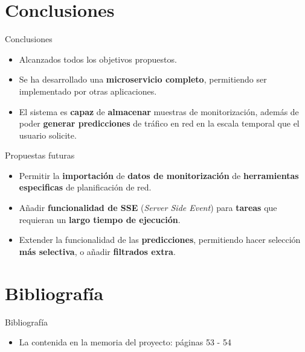 \documentclass[aspectratio=169,xcolor=dvipsnames]{beamer}
\begin{document}
	
	\section{Conclusiones}
	
	\begin{frame}{Conclusiones}
		\begin{itemize}
			\item Alcanzados todos los objetivos propuestos.
			
			\item Se ha desarrollado una \textbf{microservicio completo}, permitiendo ser implementado por otras aplicaciones.
			
			\item El sistema es \textbf{capaz} de \textbf{almacenar} muestras de monitorización, además de poder \textbf{generar predicciones} de tráfico en red en la escala temporal que el usuario solicite.
		\end{itemize}
	
		\begin{exampleblock}{Propuestas futuras}
			\begin{itemize}
				\item Permitir la \textbf{importación} de \textbf{datos de monitorización} de \textbf{herramientas especificas} de planificación de red.
				
				\item Añadir \textbf{funcionalidad de SSE} (\textit{Server Side Event}) para \textbf{tareas} que requieran un \textbf{largo tiempo de ejecución}.
				
				\item Extender la funcionalidad de las \textbf{predicciones}, permitiendo hacer selección \textbf{más selectiva}, o añadir \textbf{filtrados extra}.
			\end{itemize}
		\end{exampleblock}
	\end{frame}
	
	
	\section{Bibliografía}
	
	\begin{frame}{Bibliografía}
		\begin{itemize}
		    \item La contenida en la memoria del proyecto: páginas 53 - 54
		\end{itemize}
	\end{frame}
	
\end{document}
